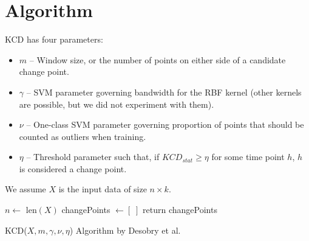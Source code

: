 \documentclass[12pt]{article}
\begin{document}
\section{Algorithm}

KCD has four parameters: 

\begin{itemize}
\item $m$ -- Window size, or the number of points on either side of a candidate change point.
\item $\gamma$ -- SVM parameter governing bandwidth for the RBF kernel (other kernels are possible, but we did not experiment with them).
\item $\nu$ -- One-class SVM parameter governing proportion of points that should be counted as outliers when training.
\item $\eta$ -- Threshold parameter such that, if $KCD_{stat} \ge \eta$ for some time point $h$, $h$ is considered a change point.
\end{itemize}

We assume $X$ is the input data of size $n \times k$.

\begin{function}[H]
	\SetAlgoLined
	$n \gets$ len$(X)$ \;
	\BlankLine
	changePoints $\gets [ \; ]$ \;
	\BlankLine
	return changePoints
 \caption{KCD($X, m, \gamma, \nu, \eta$) Algorithm by Desobry et al.\cite{1468491}}
\end{function}



\end{document}
